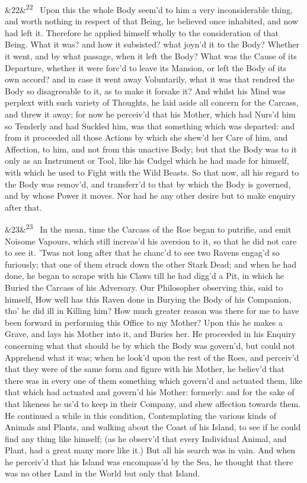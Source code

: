 \documentclass[12pt]{article}
\newcommand{\para}[1][]{\par\noindent\ifx&#1&\else\textsuperscript{\footnotesize #1}~\fi}
\begin{document}
\para[22] Upon this the whole Body seem'd to him a very inconsiderable thing, and worth nothing in respect of that Being, he believed once inhabited, and now had left it. Therefore he applied himself wholly to the consideration of that Being. What it was? and how it subsisted? what joyn'd it to the Body? Whether it went, and by what passage, when it left the Body? What was the Cause of its Departure, whether it were forc'd to leave its Mansion, or left the Body of its own accord? and in case it went away Voluntarily, what it was that rendred the Body so disagreeable to it, as to make it forsake it? And whilst his Mind was perplext with such variety of Thoughts, he laid aside all concern for the Carcass, and threw it away; for now he perceiv'd that his Mother, which had Nurs'd him so Tenderly and had Suckled him, was that something which was departed: and from it proceeded all those Actions by which she shew'd her Care of him, and Affection, to him, and not from this unactive Body; but that the Body was to it only as an Instrument or Tool, like his Cudgel which he had made for himself, with which he used to Fight with the Wild Beasts. So that now, all his regard to the Body was remov'd, and transferr'd to that by which the Body is governed, and by whose Power it moves. Nor had he any other desire but to make enquiry after that.

\para[23] In the mean, time the Carcass of the Roe began to putrifie, and emit Noisome Vapours, which still increas'd his aversion to it, so that he did not care to see it. 'Twas not long after that he chanc'd to see two Ravens engag'd so furiously; that one of them struck down the other Stark Dead; and when he had done, he began to scrape with his Claws till he had digg'd a Pit, in which he Buried the Carcass of his Adversary. Our Philosopher observing this, said to himself, How well has this Raven done in Burying the Body of his Companion, tho' he did ill in Killing him? How much greater reason was there for me to have been forward in performing this Office to my Mother? Upon this he makes a Grave, and lays his Mother into it, and Buries her. He proceeded in his Enquiry concerning what that should be by which the Body was govern'd, but could not Apprehend what it was; when he look'd upon the rest of the Roes, and perceiv'd that they were of the same form and figure with his Mother, he believ'd that there was in every one of them something which govern'd and actuated them, like that which had actuated and govern'd his Mother: formerly: and for the sake of that likeness he us'd to keep in their Company, and shew affection towards them. He continued a while in this condition, Contemplating the various kinds of Animals and Plants, and walking about the Coast of his Island, to see if he could find any thing like himself; (as he observ'd that every Individual Animal, and Plant, had a great many more like it.) But all his search was in vain. And when he perceiv'd that his Island was encompass'd by the Sea, he thought that there was no other Land in the World but only that Island.
\end{document}
